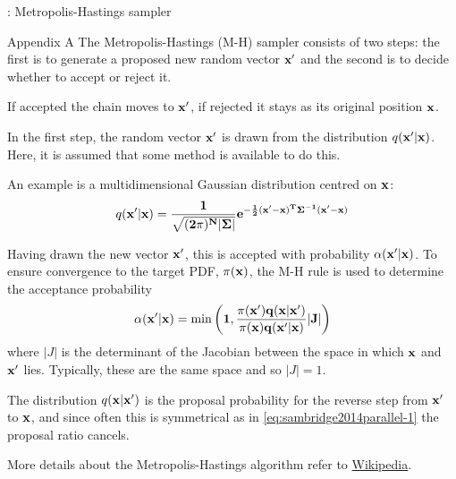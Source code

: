 

\begin{frame}[c]{\titleprefix: Metropolis-Hastings sampler}

  \tiny
  \begin{block}{Appendix A}
    The Metropolis-Hastings (M-H) sampler consists of two steps:
    the first is to generate a proposed new random vector $\bf x'$
    and the second is to decide whether to accept or reject it.

    If accepted the chain moves to $\bf x'$,
    if rejected it stays as its original position $\bf x$.

    In the first step, the random vector $\bf x'$ is drawn from
    the distribution $q(\bf x' | \bf x)$.
    Here, it is assumed that some method is available to do this.

    An example is a multidimensional Gaussian distribution centred on $\bf x$:
    \begin{equation}\label{eq:sambridge2014parallel-1}
      q(\bf x' | \bf x) = \frac{1}{ \sqrt{(2\pi)^N | \Sigma |} }
        e^{ - \frac{1}{2} (\bf x' - \bf x)^T \Sigma^{-1} (\bf x' - \bf x) }
    \end{equation}

    Having drawn the new vector $\bf x'$,
    this is accepted with probability $\alpha(\bf x' | \bf x)$.
    To ensure convergence to the target PDF, $\pi(\bf x)$,
    the M-H rule is used to determine the acceptance probability
    \[ \alpha(\bf x' | \bf x) = \min\left( 1,
      \frac{ \pi(\bf x') q(\bf x | \bf x') }{ \pi(\bf x) q(\bf x' | \bf x) }
      |J| \right) \]
    where $|J|$ is the determinant of the Jacobian
    between the space in which $\bf x$ and $\bf x'$ lies.
    Typically, these are the same space and so $|J| = 1$.

    The distribution $q(\bf x | \bf x')$ is the proposal probability
    for the reverse step from $\bf x'$ to $\bf x$,
    and since often this is symmetrical as in \eqref{eq:sambridge2014parallel-1}
    the proposal ratio cancels.

  \end{block}

  More details about the Metropolis-Hastings algorithm refer to
  \href{https://en.wikipedia.org/wiki/%
  Metropolis-Hastings_algorithm\#Formal_derivation}{Wikipedia}.

\end{frame}
